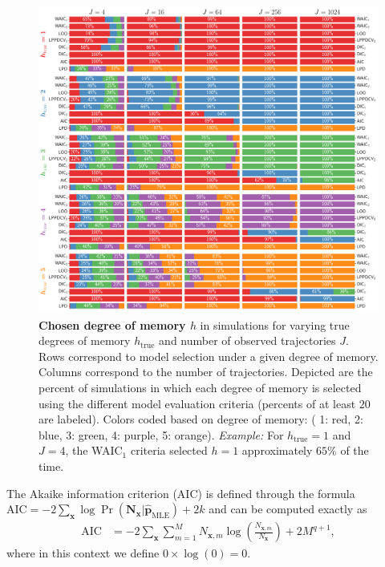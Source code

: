 \documentclass{IOS-Book-Article}
\newcommand{\bN}{\mathbf{N}}
\newcommand{\bx}{\mathbf{x}}
\newcommand{\bp}{\mathbf{p}}
\begin{document}
\begin{figure}[!ht]
\includegraphics[width=\textwidth]{fig2}
\caption{\textbf{Chosen degree of memory $h$} in simulations for varying true degrees of memory  $h_{\textrm{true}}$ and number of observed trajectories $J$. Rows correspond to model selection under a given degree of memory. Columns correspond to the number of trajectories. Depicted are the percent of simulations in which each degree of memory is selected using the different model evaluation criteria (percents of at least $20$ are labeled). Colors coded based on degree of memory: ({\color{Set1_5_red} 1: red}, {\color{Set1_5_blue} 2: blue}, {\color{Set1_5_green}3: green}, {\color{Set1_5_purple}4: purple}, {\color{Set1_5_orange}5: orange}). \emph{Example:} For $h_{\textrm{true}}=1$ and $J=4$, the WAIC$_1$ criteria selected $h=1$ approximately $65\%$ of the time. }
\label{fig:fig2}
\end{figure}



The Akaike information criterion (AIC) is defined through the formula $\textrm{AIC}  = -2 \sum_{\bx}\log \Pr(\bN_\bx \vert \hat{\bp}_{\textrm{MLE}}) + 2k$ and can be computed exactly as
\begin{align}
\textrm{AIC}  &= -2\sum_{\bx}\sum_{m=1}^M N_{\bx,m}\log \left( \frac{N_{\bx,m}}{N_\bx} \right)+ 2M^{q+1},
\end{align}
where in this context we define $0\times\log(0)=0$.
\end{document}
